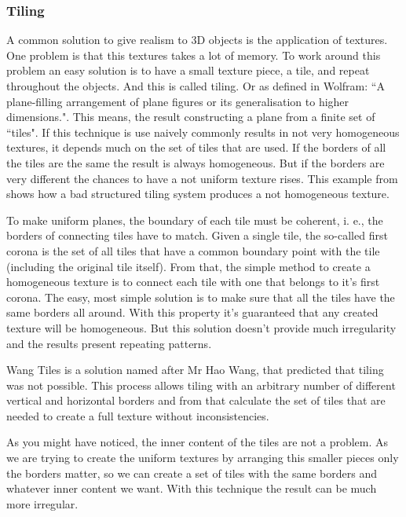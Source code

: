 
\subsubsection{Tiling} %
\label{ssub:tiling}

A common solution to give realism to 3D objects is the application of textures. One problem is that this textures takes a lot of memory. To work around this problem an easy solution is to have a small texture piece, a tile, and repeat throughout the objects. And this is called tiling. Or as defined in Wolfram: ``A plane-filling arrangement of plane figures or its generalisation to higher dimensions.".  This means, the result constructing a plane from a finite set of ``tiles". 
If this technique is use naively commonly results in not very homogeneous textures, it depends much on the set of tiles that are used. If the borders of all the tiles are the same the result is always homogeneous. But if the borders are very different the chances to have a not uniform texture rises. This example from \cite{ProcWorld} shows how a bad structured tiling system produces a not homogeneous texture.  





To make uniform planes, the boundary of each tile must be coherent, i. e., the borders of connecting tiles have to match. Given a single tile, the so-called first corona is the set of all tiles that have a common boundary point with the tile (including the original tile itself). From that, the simple method to create a homogeneous texture is to connect each tile with one that belongs to it's first corona.
The easy, most simple solution is to make sure that all the tiles have the same borders all around. With this property it's guaranteed that any created texture will be homogeneous. But this solution doesn't provide much irregularity and the results present repeating patterns. 


Wang Tiles is a solution named after Mr Hao Wang, that predicted that tiling was not possible. This process allows tiling with an arbitrary number of different vertical and horizontal borders and from that calculate the set of tiles that are needed to create a full texture without inconsistencies. 



As you might have noticed, the inner content of the tiles are not a problem. As we are trying to create the uniform textures by arranging this smaller pieces only the borders matter, so we can create a set of tiles with the same borders and whatever inner content we want. With this technique the result can be much more irregular. 



